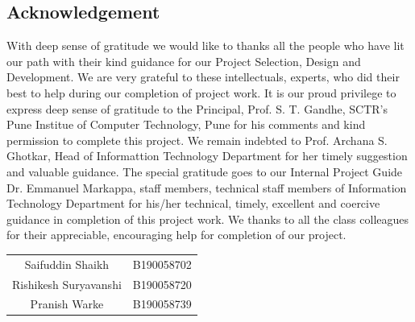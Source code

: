 \documentclass[12pt,a4paper]{report}     %
\begin{document}
\newpage	
\pagestyle{plain}
\pagestyle{fancy}							%
\renewcommand{\headrulewidth}{0pt}
\fancyfoot[LO]{\textit{}}			%
		\pagestyle{plain}           %
		\begin{center}				%
			\begin{LARGE}
	\section*{Acknowledgement}
			\end{LARGE}
		\end{center}
		\begin{normalsize}
{\setlength{\baselineskip}{1.1\baselineskip}
\noindent %
With deep sense of gratitude we would like to thanks all the people who have lit our path with their
kind guidance for our Project Selection, Design and Development. We are very grateful to these
intellectuals, experts, who did their best to help during our completion of project work.
\newline
It is our proud privilege to express deep sense of gratitude to the Principal, Prof. S. T. Gandhe,
SCTR's Pune Institue of Computer Technology, Pune for his comments and kind permission to complete this project. We
remain indebted to Prof. Archana S. Ghotkar, Head of Informattion Technology Department for her timely
suggestion and valuable guidance.
\newline
The special gratitude goes to our Internal Project Guide Dr. Emmanuel Markappa, staff members,
technical staff members of Information Technology Department for his/her technical, timely, excellent
and coercive guidance in completion of this project work. We thanks to all the class colleagues for
their appreciable, encouraging help for completion of our project.








			\vspace{1.8in}
				\begin{flushright} 
\begin{tabular}{ c c }
    
   Saifuddin Shaikh & B190058702 \\
    Rishikesh Suryavanshi & B190058720 \\
    Pranish Warke & B190058739 \\
\end{tabular}
 \end{flushright}

}
		\end{normalsize}
		
\end{document}
